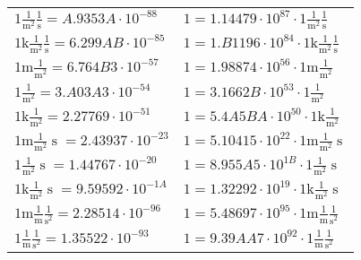 \begin{center}
\begin{longtable}{l l}
{\color{black}$1 \bm{\mathrm{ }}\frac1{\operatorname{m}^2}\frac1{\operatorname{s}}{}{} = A.9353A\cdot10^{-88} $}   & {\color{black}$ 1 = 1.14479\cdot10^{87} \cdot 1 \bm{\mathrm{ }}\frac1{\operatorname{m}^2}\frac1{\operatorname{s}}{}{}$}  \\
{\color{gray}$1 \bm{\mathrm{ k}}\frac1{\operatorname{m}^2}\frac1{\operatorname{s}}{}{} = 6.299AB\cdot10^{-85} $}   & {\color{gray}$ 1 = 1.B1196\cdot10^{84} \cdot 1 \bm{\mathrm{ k}}\frac1{\operatorname{m}^2}\frac1{\operatorname{s}}{}{}$}  \\
{\color{gray}$1 \bm{\mathrm{ m}}\frac1{\operatorname{m}^2}{}{}{} = 6.764B3\cdot10^{-57} $}   & {\color{gray}$ 1 = 1.98874\cdot10^{56} \cdot 1 \bm{\mathrm{ m}}\frac1{\operatorname{m}^2}{}{}{}$}  \\
{\color{black}$1 \bm{\mathrm{ }}\frac1{\operatorname{m}^2}{}{}{} = 3.A03A3\cdot10^{-54} $}   & {\color{black}$ 1 = 3.1662B\cdot10^{53} \cdot 1 \bm{\mathrm{ }}\frac1{\operatorname{m}^2}{}{}{}$}  \\
{\color{gray}$1 \bm{\mathrm{ k}}\frac1{\operatorname{m}^2}{}{}{} = 2.27769\cdot10^{-51} $}   & {\color{gray}$ 1 = 5.4A5BA\cdot10^{50} \cdot 1 \bm{\mathrm{ k}}\frac1{\operatorname{m}^2}{}{}{}$}  \\
{\color{gray}$1 \bm{\mathrm{ m}}\frac1{\operatorname{m}^2}{\operatorname{s}}{}{} = 2.43937\cdot10^{-23} $}   & {\color{gray}$ 1 = 5.10415\cdot10^{22} \cdot 1 \bm{\mathrm{ m}}\frac1{\operatorname{m}^2}{\operatorname{s}}{}{}$}  \\
{\color{black}$1 \bm{\mathrm{ }}\frac1{\operatorname{m}^2}{\operatorname{s}}{}{} = 1.44767\cdot10^{-20} $}   & {\color{black}$ 1 = 8.955A5\cdot10^{1B} \cdot 1 \bm{\mathrm{ }}\frac1{\operatorname{m}^2}{\operatorname{s}}{}{}$}  \\
{\color{gray}$1 \bm{\mathrm{ k}}\frac1{\operatorname{m}^2}{\operatorname{s}}{}{} = 9.59592\cdot10^{-1A} $}   & {\color{gray}$ 1 = 1.32292\cdot10^{19} \cdot 1 \bm{\mathrm{ k}}\frac1{\operatorname{m}^2}{\operatorname{s}}{}{}$}  \\
{\color{gray}$1 \bm{\mathrm{ m}}\frac1{\operatorname{m}}\frac1{\operatorname{s}^2}{}{} = 2.28514\cdot10^{-96} $}   & {\color{gray}$ 1 = 5.48697\cdot10^{95} \cdot 1 \bm{\mathrm{ m}}\frac1{\operatorname{m}}\frac1{\operatorname{s}^2}{}{}$}  \\
{\color{black}$1 \bm{\mathrm{ }}\frac1{\operatorname{m}}\frac1{\operatorname{s}^2}{}{} = 1.35522\cdot10^{-93} $}   & {\color{black}$ 1 = 9.39AA7\cdot10^{92} \cdot 1 \bm{\mathrm{ }}\frac1{\operatorname{m}}\frac1{\operatorname{s}^2}{}{}$}  \\

\end{longtable}
\end{center}
